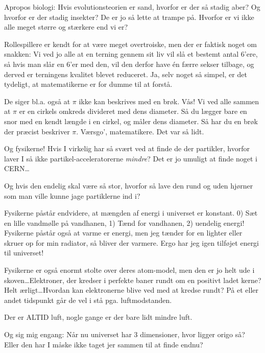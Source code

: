 \documentclass[a4paper,11pt]{article}
\begin{document}
\begin{sketch}
 Apropos biologi: Hvis evolutionsteorien er sand, hvorfor er der så
stadig aber?  Og hvorfor er der stadig insekter? De er jo så lette at
trampe på. Hvorfor er vi ikke alle meget større og stærkere end vi er?

 Rollespillere er kendt for at være meget overtroiske, men der
er faktisk noget om snakken: Vi ved jo alle at en terning gennem sit
liv vil slå et bestemt antal 6'ere, så hvis man slår en 6'er med den,
vil den derfor have én færre sekser tilbage, og derved er terningens
kvalitet blevet reduceret.  Ja, selv noget så simpel, er det tydeligt,
at matematikerne er for dumme til at forstå.

 De siger bl.a. også at $\pi$ ikke kan beskrives med en
brøk. Vås! Vi ved alle sammen at $\pi$ er en cirkels omkreds divideret
med dens diameter. Så du lægger bare en snor med en kendt længde i en
cirkel, og måler dens diameter. Så har du en brøk der præcist
beskriver $\pi$. Værsgo', matematikere. Det var så lidt.


  Og fysikerne! Hvis I virkelig
har så svært ved at finde de der partikler, hvorfor laver I så ikke
partikel-acceleratorerne \textit{mindre}? Det er jo umuligt at finde
noget i CERN\ldots

 Og hvis den endelig skal være så stor, hvorfor så lave den
rund og uden hjørner som man ville kunne jage partiklerne ind i?

 Fysikerne påstår endvidere, at mængden af energi i universet
er konstant.  0) Sæt en lille vandmølle på vandhanen, 1)
Tænd for vandhanen, 2) uendelig energi!  Fysikerne påstår også at
varme er energi, men jeg tænder for en lighter eller skruer op for min
radiator, så bliver der varmere. Ergo har jeg igen tilføjet energi til
universet!

 Fysikerne er også enormt stolte over deres atom-model, men
den er jo helt ude i skoven\ldots Elektroner, der kredser i perfekte
baner rundt om en positivt ladet kerne? Helt ærligt\ldots Hvordan kan
elektronerne blive ved med at kredse rundt? På et eller andet
tidspunkt går de vel i stå pga. luftmodstanden.


 Der er ALTID luft, nogle gange er der bare lidt mindre luft.

 Og sig mig engang: Når nu universet har 3 dimensioner, hvor
ligger origo så? Eller den har I måske ikke taget jer sammen til at
finde endnu?


\end{sketch}
\end{document}
